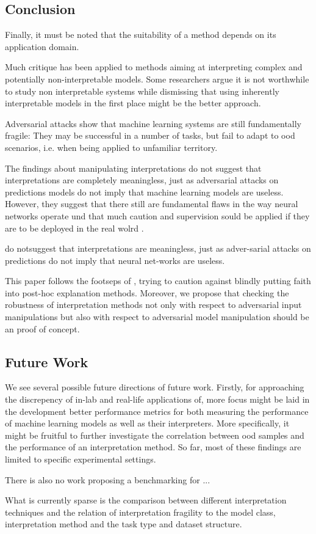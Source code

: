 \subsection{Conclusion}
Finally, it must be noted that the suitability of a method depends on its application domain. 


Much critique has been applied to methods aiming at interpreting complex and potentially non-interpretable models. 
Some researchers argue it is not worthwhile to study non interpretable systems while dismissing that using inherently interpretable models in the first place might be the better approach. 

Adversarial attacks show that machine learning systems are still fundamentally fragile: They may be successful in a number of tasks, but fail to adapt to ood scenarios, i.e. when being applied to unfamiliar territory. 

 The findings about manipulating interpretations do not suggest that interpretations are completely meaningless, just as adversarial attacks on predictions models do not imply that machine learning models are useless. However, they suggest that there still are fundamental flaws in the way neural networks operate und that much caution and supervision sould be applied if they are to be deployed in the real wolrd .


do  notsuggest that interpretations are meaningless, just as adver-sarial  attacks  on  predictions  do  not  imply  that  neural  net-works are useless. 

This paper follows the footseps of \cite{lipton2018mythos}, trying to caution against blindly putting faith into post-hoc explanation methods. 
Moreover, we propose that checking the robustness of interpretation methods not only with respect to adversarial input manipulations but also with respect to adversarial model manipulation should be an proof of concept. 




\subsection{Future Work}
We see several possible future directions of future work. 
Firstly, for approaching the discrepency of in-lab and real-life applications of, more focus might be laid in the development better performance metrics for both measuring the performance of machine learning models as well as their interpreters. 
More specifically, it might be fruitful to further investigate the correlation between ood samples and the performance of an interpretation method. So far, most of these findings are limited to specific experimental settings. 


There is also no work proposing a benchmarking for ... 

What is currently sparse is the comparison between different interpretation techniques and the relation of interpretation fragility to the model class, interpretation method and the task type and dataset structure. 
